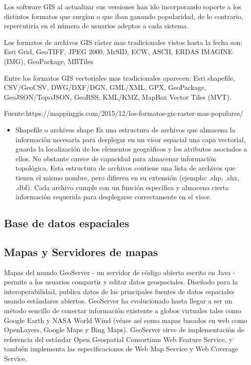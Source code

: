 Los software GIS al actualizar sus versiones han ido incorporando soporte a los distintos formatos que surgían o que iban ganando popularidad, de lo contrario, repercutiría en el número de usuarios adeptos a cada sistema.

Los formatos de archivos GIS ráster mas tradicionales vistos hasta la fecha son: Esri Grid, GeoTIFF, JPEG 2000, MrSID, ECW, ASCII, ERDAS IMAGINE (IMG), GeoPackage, MBTiles

Entre los formatos GIS vectoriales mas tradicionales aparecen: Esri shapefile, CSV/GeoCSV, DWG/DXF/DGN, GML/XML, GPX, GeoPackage, GeoJSON/TopoJSON, GeoRSS, KML/KMZ, MapBox Vector Tiles (MVT).

Fuente:https://mappinggis.com/2015/12/los-formatos-gis-raster-mas-populares/

\begin{itemize}
\item Shapefile o archivos shape
Es una estructura de archivos que almacena la información necesaria para desplegar en un visor espacial una capa vectorial, guarda la localización de los elementos geográficos y los atributos asociados a ellos. No obstante carece de capacidad para almacenar información topológica. Esta estructura de archivos contiene una lista de archivos que tienen el mismo nombre, pero difieren en su extensión (ejemplo: .shp, .shx, .dbf). Cada archivo cumple con un función específica y almacena cierta información requerida para desplegarse correctamente en el visor.

\end{itemize}

\subsection{Base de datos espaciales}


\subsection{Mapas y Servidores de mapas}

Mapas del mundo
GeoServer - un servidor de código abierto escrito en Java - permite a los usuarios compartir y editar datos geospaciales. Diseñado para la interoperabilidad, publica datos de las principales fuentes de datos espaciales usando estándares abiertos. GeoServer ha evolucionado hasta llegar a ser un método sencillo de conectar información existente a globos virtuales tales como Google Earth y NASA World Wind (véase así como mapas basados en web como OpenLayers, Google Maps y Bing Maps). GeoServer sirve de implementación de referencia del estándar Open Geospatial Consortium Web Feature Service, y también implementa las especificaciones de Web Map Service y Web Coverage Service.

